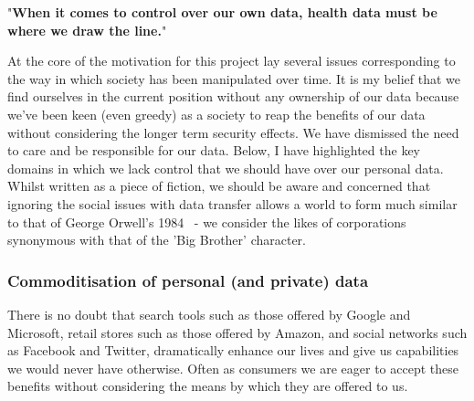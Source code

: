 \begin{displayquote}{
  "\textbf{When it comes to control over our own data, health data must be where we draw the line.}"~\parencite{wilbankstopol:2016:article}
}\end{displayquote}






At the core of the motivation for this project lay several issues corresponding to the way in which society has been manipulated over time. It is my belief that we find ourselves in the current position without any ownership of our data because we've been keen (even greedy) as a society to reap the benefits of our data without considering the longer term security effects. We have dismissed the need to care and be responsible for our data. Below, I have highlighted the key domains in which we lack control that we should have over our personal data. Whilst written as a piece of fiction, we should be aware and concerned that ignoring the social issues with data transfer allows a world to form much similar to that of George Orwell's 1984~\autocite{orwell:1984:book} - we consider the likes of corporations synonymous with that of the 'Big Brother' character.

\subsubsection{Commoditisation of personal (and private) data}

There is no doubt that search tools such as those offered by Google and Microsoft, retail stores such as those offered by Amazon, and social networks such as Facebook and Twitter, dramatically enhance our lives and give us capabilities we would never have otherwise. Often as consumers we are eager to accept these benefits without considering the means by which they are offered to us.

